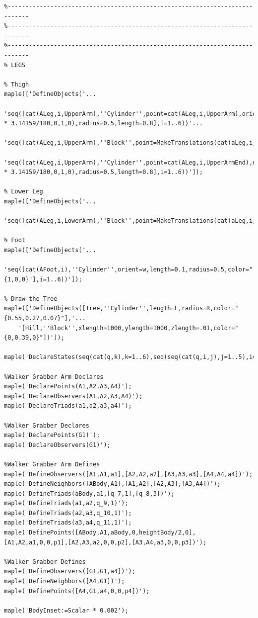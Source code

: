 \documentclass{article}
\begin{document}
\begin{verbatim}
%----------------------------------------------------------------------------
%----------------------------------------------------------------------------
%----------------------------------------------------------------------------
% LEGS

% Thigh
maple(['DefineObjects('...
	'seq([cat(ALeg,i,UpperArm),''Cylinder'',point=cat(ALeg,i,UpperArm),orient=MakeRotations(90 * 3.14159/180,0,1,0),radius=0.5,length=0.8],i=1..6))'...
	'seq([cat(ALeg,i,UpperArm),''Block'',point=MakeTranslations(cat(aLeg,i,UpperArm),0,0,LengthUpperArm/2),zlength=LengthUpperArm,ylength=1,xlength=0.8],i=1..6))'...
	'seq([cat(ALeg,i,UpperArm),''Cylinder'',point=cat(ALeg,i,UpperArmEnd),orient=MakeRotations(90 * 3.14159/180,0,1,0),radius=0.5,length=0.8],i=1..6))']);

% Lower Leg
maple(['DefineObjects('...
	'seq([cat(ALeg,i,LowerArm),''Block'',point=MakeTranslations(cat(aLeg,i,LowerArm),0,0,LengthLowerArm/2),zlength=LengthLowerArm,ylength=0.5,xlength=0.6],i=1..6))']);

% Foot
maple(['DefineObjects('...
	'seq([cat(AFoot,i),''Cylinder'',orient=w,length=0.1,radius=0.5,color="{1,0,0}"],i=1..6))']);

% Draw the Tree
maple(['DefineObjects([Tree,''Cylinder'',length=L,radius=R,color="{0.55,0.27,0.07}"],'...
    '[Hill,''Block'',xlength=1000,ylength=1000,zlength=.01,color="{0,0.39,0}"])']);

maple('DeclareStates(seq(cat(q,k),k=1..6),seq(seq(cat(q,i,j),j=1..5),i=1..6))');

%Walker Grabber Arm Declares
maple('DeclarePoints(A1,A2,A3,A4)');
maple('DeclareObservers(A1,A2,A3,A4)');
maple('DeclareTriads(a1,a2,a3,a4)');

%Walker Grabber Declares
maple('DeclarePoints(G1)');
maple('DeclareObservers(G1)');

%Walker Grabber Arm Defines
maple('DefineObservers([A1,A1,a1],[A2,A2,a2],[A3,A3,a3],[A4,A4,a4])');
maple('DefineNeighbors([ABody,A1],[A1,A2],[A2,A3],[A3,A4])');
maple('DefineTriads(aBody,a1,[q_7,1],[q_8,3])');
maple('DefineTriads(a1,a2,q_9,1)');
maple('DefineTriads(a2,a3,q_10,1)');
maple('DefineTriads(a3,a4,q_11,1)');
maple('DefinePoints([ABody,A1,aBody,0,heightBody/2,0],[A1,A2,a1,0,0,p1],[A2,A3,a2,0,0,p2],[A3,A4,a3,0,0,p3])');

%Walker Grabber Defines
maple('DefineObservers([G1,G1,a4])');
maple('DefineNeighbors([A4,G1])');
maple('DefinePoints([A4,G1,a4,0,0,p4])');

maple('BodyInset:=Scalar * 0.002');



\end{verbatim}
\end{document}
